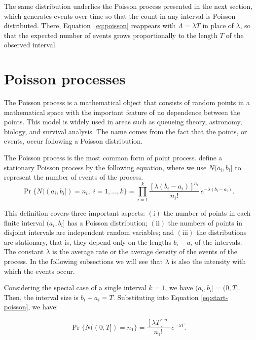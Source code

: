     The same distribution underlies the Poisson process presented in the next section, which generates events over time so that the count in any interval is Poisson distributed. There, Equation~\eqref{eq:poisson} reappears with $\Lambda = \lambda T$ in place of $\lambda$, so that the expected number of events grows proportionally to the length $T$ of the observed interval.


\section{Poisson processes}\label{sec:processos-de-poisson}

    The Poisson process is a mathematical object that consists of random points in a mathematical space with the important feature of no dependence between the points. This model is widely used in areas such as queueing theory, astronomy, biology, and survival analysis. The name comes from the fact that the points, or events, occur following a Poisson distribution.

    The Poisson process is the most common form of point process.  define a stationary Poisson process by the following equation, where we use $N(a_i, b_i]$ to represent the number of events of the process.
    \begin{equation}
        \Pr\{N((a_i, b_i]) = n_i,\; i = 1, \ldots, k\}
        =
        \prod_{i=1}^{k}
        \frac{[\lambda (b_i - a_i)]^{n_i}}{n_i!}\,
        e^{-\lambda (b_i - a_i)}.
        \label{eq:start-poisson}
    \end{equation}

    This definition covers three important aspects: $(\mathrm{i})$ the number of points in each finite interval $(a_i,b_i]$ has a Poisson distribution; $(\mathrm{ii})$ the numbers of points in disjoint intervals are independent random variables; and $(\mathrm{iii})$ the distributions are stationary, that is, they depend only on the lengths $b_i-a_i$ of the intervals. The constant $\lambda$ is the average rate or the average density of the events of the process. In the following subsections we will see that $\lambda$ is also the intensity with which the events occur.

    Considering the special case of a single interval $k=1$, we have $(a_i, b_i] = (0,T]$. Then, the interval size is $b_i-a_i=T$. Substituting into Equation \eqref{eq:start-poisson}, we have:

    \begin{equation}
        \Pr\{N((0,T]) = n_1\}
        = \frac{[\lambda T]^{n_1}}{n_1!}\,
        e^{-\lambda T}.
        \label{eq:poisson-lambda}
    \end{equation}

